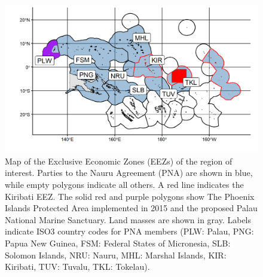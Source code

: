 \documentclass[12pt]{article}
\begin{document}
\begin{figure}
\centering
\includegraphics{img/PNA_map.png}
\caption{\label{fig:PNA_map}Map of the Exclusive Economic Zones (EEZs) of the region of interest. Parties to the Nauru Agreement (PNA) are shown in blue, while empty polygons indicate all others. A red line indicates the Kiribati EEZ. The solid red and purple polygons show The Phoenix Islands Protected Area implemented in 2015 and the proposed Palau National Marine Sanctuary. Land masses are shown in gray. Labels indicate ISO3 country codes for PNA members (PLW: Palau, PNG: Papua New Guinea, FSM: Federal States of Micronesia, SLB: Solomon Islands, NRU: Nauru, MHL: Marshal Islands, KIR: Kiribati, TUV: Tuvalu, TKL: Tokelau).}
\end{figure}
\end{document}
